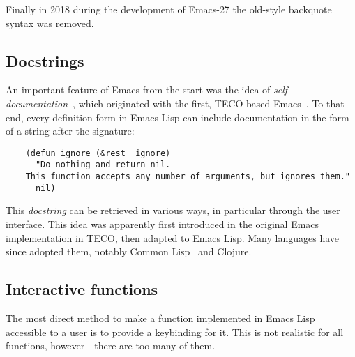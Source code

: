 \documentclass[format=acmsmall, review]{acmart}
\newcommand \Elisp {Emacs Lisp}
\begin{document}
Finally in 2018 during the development of Emacs-27 the
old-style backquote syntax was removed.

\subsection{Docstrings}
\label{sec:docstrings}

An important feature of Emacs from the start was the idea of
\emph{self-documentation}~\cite{Stallman1981}, which originated with
the first, TECO-based Emacs~\cite{Stallman2018-personal}.  To that end, every
definition form in \Elisp{} can include documentation in the form of a
string after the signature:
\begin{verbatim}
    (defun ignore (&rest _ignore)
      "Do nothing and return nil.
    This function accepts any number of arguments, but ignores them."
      nil)
\end{verbatim}
This \emph{docstring} can be retrieved in various ways, in particular
through the user interface.  This idea was apparently first introduced in
the original Emacs implementation in TECO, then adapted to \Elisp{}.
Many languages have since adopted them, notably Common
Lisp~\cite{HyperSpec} and Clojure.

\subsection{Interactive functions}
\label{sec:interactive-functions}

The most direct method to make a function implemented in \Elisp{}
accessible to a user is to provide a keybinding for it.  This is not
realistic for all functions, however---there are too many of them.
\end{document}
